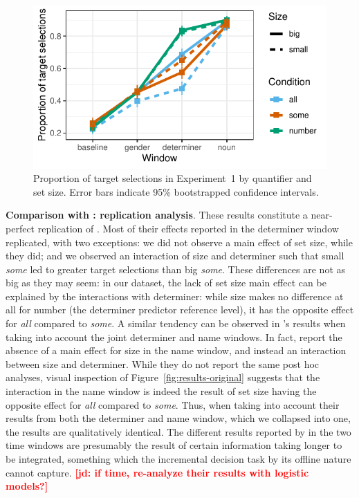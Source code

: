 \documentclass[10pt,letterpaper]{article}
\newcommand{\figref}[1]{Figure~\ref{#1}}
\newcommand{\expref}[1]{Experiment~#1}
\newcommand{\jd}[1]{\textcolor{Red}{\textbf{[jd: #1]}}}
\begin{document}
\begin{figure}[H]
\centering
\includegraphics[width=\columnwidth]{../../analysis/SunBreheny/1_incremental/main/graphs/results-target-all-looks}
\caption{Proportion of target selections in \expref{1} by quantifier and set size. Error bars indicate 95\% bootstrapped confidence intervals.} 
\label{fig:results-idt}
\end{figure}

\textbf{Comparison with : replication analysis}. These results constitute a near-perfect replication of  . Most of their effects reported in the determiner window replicated, with two exceptions: we did not observe a main effect of set size, while they did; and we observed an interaction of size and determiner such that small \emph{some} led to greater target selections than big \emph{some}. These differences are not as big as they may seem: in our dataset, the lack of set size main effect can be explained by the interactions with determiner: while size makes no difference at all for number (the determiner predictor reference level), it has the opposite effect for \emph{all} compared to \emph{some}. A similar tendency can be observed in  's results when taking into account the joint determiner and name windows. In fact,   report the absence of a main effect for size in the name window, and instead an interaction between size and determiner. While they do not report the same post hoc analyses, visual inspection of \figref{fig:results-original} suggests that the interaction in the name window is indeed the result of set size having the opposite effect for \emph{all} compared to \emph{some}. Thus, when taking into account their results from both the determiner and name window, which we collapsed into one, the results are qualitatively identical. The different results reported by   in the two time windows are presumably the result of certain information taking longer to be integrated, something which the incremental decision task by its offline nature cannot capture. \jd{if time, re-analyze their results with logistic models?}
\end{document}
